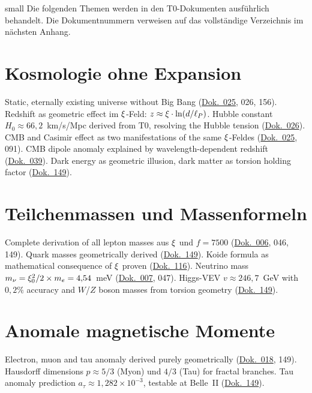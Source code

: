 small
Die folgenden Themen werden in den T0-Dokumenten ausführlich behandelt. Die Dokumentnummern verweisen auf das vollständige Verzeichnis im nächsten Anhang.

\section{Kosmologie ohne Expansion}
Static, eternally existing universe without Big Bang (\href{https://github.com/jpascher/T0-Time-Mass-Duality/blob/main/2/pdf/025_T0_Kosmologie_De.pdf}{Dok.~025}, 026, 156). Redshift as geometric effect im $\xi$-Feld: $z \approx \xi \cdot \ln(d/\ell_P)$. Hubble constant $H_0 \approx 66{,}2$~km/s/Mpc derived from T0, resolving the Hubble tension (\href{https://github.com/jpascher/T0-Time-Mass-Duality/blob/main/2/pdf/026_T0_Geometrische_Kosmologie_De.pdf}{Dok.~026}). CMB and Casimir effect as two manifestations of the same $\xi$-Feldes (\href{https://github.com/jpascher/T0-Time-Mass-Duality/blob/main/2/pdf/025_T0_Kosmologie_De.pdf}{Dok.~025}, 091). CMB dipole anomaly explained by wavelength-dependent redshift (\href{https://github.com/jpascher/T0-Time-Mass-Duality/blob/main/2/pdf/039_Zwei-Dipole-CMB_De.pdf}{Dok.~039}). Dark energy as geometric illusion, dark matter as torsion holding factor (\href{https://github.com/jpascher/T0-Time-Mass-Duality/blob/main/2/pdf/149_FFGFT-torsion_De.pdf}{Dok.~149}).

\section{Teilchenmassen und Massenformeln}
Complete derivation of all lepton masses aus $\xi$ und $f = 7500$ (\href{https://github.com/jpascher/T0-Time-Mass-Duality/blob/main/2/pdf/006_T0_Teilchenmassen_De.pdf}{Dok.~006}, 046, 149). Quark masses geometrically derived (\href{https://github.com/jpascher/T0-Time-Mass-Duality/blob/main/2/pdf/149_FFGFT-torsion_De.pdf}{Dok.~149}). Koide formula as mathematical consequence of $\xi$ proven (\href{https://github.com/jpascher/T0-Time-Mass-Duality/blob/main/2/pdf/116_T0_koide-formel-3_De.pdf}{Dok.~116}). Neutrino mass $m_\nu = \xi_0^2/2 \times m_e = 4{,}54$~meV (\href{https://github.com/jpascher/T0-Time-Mass-Duality/blob/main/2/pdf/007_T0_Neutrinos_De.pdf}{Dok.~007}, 047). Higgs-VEV $v \approx 246{,}7$~GeV with $0{,}2\%$ accuracy and $W$/$Z$ boson masses from torsion geometry (\href{https://github.com/jpascher/T0-Time-Mass-Duality/blob/main/2/pdf/149_FFGFT-torsion_De.pdf}{Dok.~149}).

\section{Anomale magnetische Momente}
Electron, muon and tau anomaly derived purely geometrically (\href{https://github.com/jpascher/T0-Time-Mass-Duality/blob/main/2/pdf/018_T0_Anomale-g2-10_De.pdf}{Dok.~018}, 149). Hausdorff dimensions $p \approx 5/3$ (Myon) und $4/3$ (Tau) for fractal branches. Tau anomaly prediction $a_\tau \approx 1{,}282 \times 10^{-3}$, testable at Belle~II (\href{https://github.com/jpascher/T0-Time-Mass-Duality/blob/main/2/pdf/149_FFGFT-torsion_De.pdf}{Dok.~149}).

